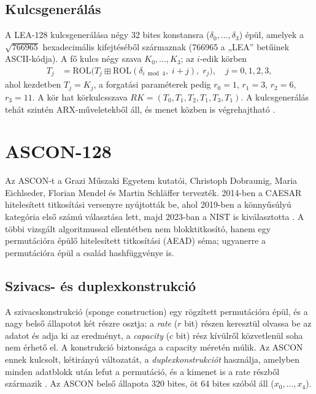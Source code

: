 \documentclass[a4paper,12pt]{report}
\theoremstyle{definition}
\theoremstyle{remark}
\begin{document}
\subsection{Kulcsgenerálás}\label{sec:lea_kulcs}

A LEA-128 kulcsgenerálása négy 32 bites konstansra ($\delta_0, \ldots, \delta_3$) épül, amelyek a $\sqrt{766965}$ hexadecimális kifejtéséből származnak (766965 a „LEA'' betűinek ASCII-kódja). A fő kulcs négy szava $K_0, \ldots, K_3$; az $i$-edik körben
\begin{align}
T_j &= \text{ROL}\big(T_j \mathbin{\boxplus} \text{ROL}(\delta_{i \bmod 4},\; i+j),\; r_j\big), \quad j = 0,1,2,3,
\end{align}
ahol kezdetben $T_j = K_j$, a forgatási paraméterek pedig $r_0 = 1$, $r_1 = 3$, $r_2 = 6$, $r_3 = 11$. A kör hat körkulcsszava $RK = (T_0, T_1, T_2, T_1, T_3, T_1)$. A kulcsgenerálás tehát szintén ARX-műveletekből áll, és menet közben is végrehajtható \cite{Hong2013}.

\section{ASCON-128}\label{sec:ascon}

Az ASCON-t a Grazi Műszaki Egyetem kutatói, Christoph Dobraunig, Maria Eichlseder, Florian Mendel és Martin Schläffer tervezték. 2014-ben a CAESAR hitelesített titkosítási versenyre nyújtották be, ahol 2019-ben a könnyűsúlyú kategória első számú választása lett, majd 2023-ban a NIST is kiválasztotta \cite{Dobraunig2021,NISTLWC2023}. A többi vizsgált algoritmussal ellentétben nem blokktitkosító, hanem egy permutációra épülő hitelesített titkosítási (AEAD) séma; ugyanerre a permutációra épül a család hashfüggvénye is.

\subsection{Szivacs- és duplexkonstrukció}\label{sec:ascon_szivacs}

A szivacskonstrukció (sponge construction) egy rögzített permutációra épül, és a nagy belső állapotot két részre osztja: a \emph{rate} ($r$ bit) részen keresztül olvassa be az adatot és adja ki az eredményt, a \emph{capacity} ($c$ bit) rész kívülről közvetlenül soha nem érhető el. A konstrukció biztonsága a capacity méretén múlik. Az ASCON ennek kulcsolt, kétirányú változatát, a \emph{duplexkonstrukciót} használja, amelyben minden adatblokk után lefut a permutáció, és a kimenet is a rate részből származik \cite{Dobraunig2021}. Az ASCON belső állapota 320 bites, öt 64 bites szóból áll ($x_0, \ldots, x_4$).
\end{document}
